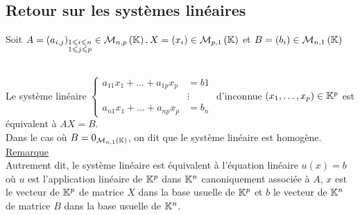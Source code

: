 \subsection{Retour sur les systèmes linéaires}
    Soit \(A = (a_{i,j} )_{\substack{1\leq i\leq n \\ 1\leq j\leq p}} \in \M{n,p}, X = (x_i) \in \M{p,1}\) et \(B = (b_i) \in  \M{n,1}\)
\begin{defprop}[Rappels]
    ~\\
    Le système linéaire \(\begin{cases}
    a_{11}x_1 + \dots + a_{1p}x_p &= b1 \\
        &\vdots \\
    a_{n1}x_1 + \dots + a_{np}x_p &= b_n
    \end{cases}\)
    d’inconnue \((x_1, \dots , x_p) \in \mathbb{K}^p\) est équivalent à \(AX = B\).\\
    Dans le cas où \(B = 0_{\M{n,1}}\), on dit que le système linéaire est homogène. \\
    \underline{Remarque} \\
    Autrement dit, le système linéaire est équivalent à l’équation linéaire \(u(x) = b\) où \(u\) est l’application linéaire de \(\mathbb{K}^p\) dans \(\mathbb{K}^n\) canoniquement associée à \(A\), \(x\) est le vecteur de \(\mathbb{K}^p\) de matrice \(X\) dans la base usuelle de \(\mathbb{K}^p\) et \(b\) le vecteur de \(\mathbb{K}^n\) de matrice \(B\) dans la base usuelle de \(\mathbb{K}^n\).
\end{defprop}


